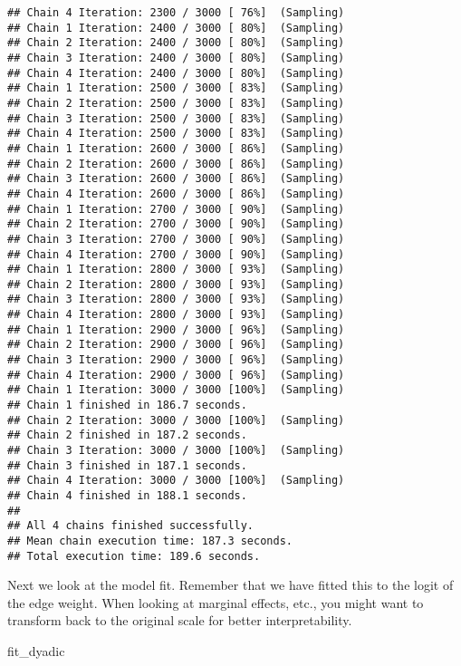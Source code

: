 \documentclass[
]{article}
\newenvironment{Shaded}{\begin{snugshade}}{\end{snugshade}}
\newcommand{\NormalTok}[1]{#1}
\begin{document}
\begin{verbatim}
## Chain 4 Iteration: 2300 / 3000 [ 76%]  (Sampling) 
## Chain 1 Iteration: 2400 / 3000 [ 80%]  (Sampling) 
## Chain 2 Iteration: 2400 / 3000 [ 80%]  (Sampling) 
## Chain 3 Iteration: 2400 / 3000 [ 80%]  (Sampling) 
## Chain 4 Iteration: 2400 / 3000 [ 80%]  (Sampling) 
## Chain 1 Iteration: 2500 / 3000 [ 83%]  (Sampling) 
## Chain 2 Iteration: 2500 / 3000 [ 83%]  (Sampling) 
## Chain 3 Iteration: 2500 / 3000 [ 83%]  (Sampling) 
## Chain 4 Iteration: 2500 / 3000 [ 83%]  (Sampling) 
## Chain 1 Iteration: 2600 / 3000 [ 86%]  (Sampling) 
## Chain 2 Iteration: 2600 / 3000 [ 86%]  (Sampling) 
## Chain 3 Iteration: 2600 / 3000 [ 86%]  (Sampling) 
## Chain 4 Iteration: 2600 / 3000 [ 86%]  (Sampling) 
## Chain 1 Iteration: 2700 / 3000 [ 90%]  (Sampling) 
## Chain 2 Iteration: 2700 / 3000 [ 90%]  (Sampling) 
## Chain 3 Iteration: 2700 / 3000 [ 90%]  (Sampling) 
## Chain 4 Iteration: 2700 / 3000 [ 90%]  (Sampling) 
## Chain 1 Iteration: 2800 / 3000 [ 93%]  (Sampling) 
## Chain 2 Iteration: 2800 / 3000 [ 93%]  (Sampling) 
## Chain 3 Iteration: 2800 / 3000 [ 93%]  (Sampling) 
## Chain 4 Iteration: 2800 / 3000 [ 93%]  (Sampling) 
## Chain 1 Iteration: 2900 / 3000 [ 96%]  (Sampling) 
## Chain 2 Iteration: 2900 / 3000 [ 96%]  (Sampling) 
## Chain 3 Iteration: 2900 / 3000 [ 96%]  (Sampling) 
## Chain 4 Iteration: 2900 / 3000 [ 96%]  (Sampling) 
## Chain 1 Iteration: 3000 / 3000 [100%]  (Sampling) 
## Chain 1 finished in 186.7 seconds.
## Chain 2 Iteration: 3000 / 3000 [100%]  (Sampling) 
## Chain 2 finished in 187.2 seconds.
## Chain 3 Iteration: 3000 / 3000 [100%]  (Sampling) 
## Chain 3 finished in 187.1 seconds.
## Chain 4 Iteration: 3000 / 3000 [100%]  (Sampling) 
## Chain 4 finished in 188.1 seconds.
## 
## All 4 chains finished successfully.
## Mean chain execution time: 187.3 seconds.
## Total execution time: 189.6 seconds.
\end{verbatim}

Next we look at the model fit. Remember that we have fitted this to the
logit of the edge weight. When looking at marginal effects, etc., you
might want to transform back to the original scale for better
interpretability.

\begin{Shaded}
\begin{Highlighting}[]
\NormalTok{fit\_dyadic}
\end{Highlighting}
\end{Shaded}
\end{document}
